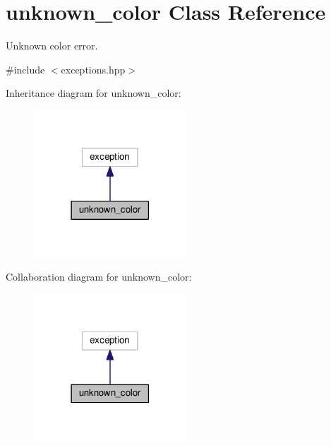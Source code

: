 \hypertarget{classunknown__color}{}\section{unknown\+\_\+color Class Reference}
\label{classunknown__color}


Unknown color error.  




{\ttfamily \#include $<$exceptions.\+hpp$>$}



Inheritance diagram for unknown\+\_\+color\+:\nopagebreak
\begin{figure}[H]
\begin{center}
\leavevmode
\includegraphics[width=162pt]{classunknown__color__inherit__graph}
\end{center}
\end{figure}


Collaboration diagram for unknown\+\_\+color\+:\nopagebreak
\begin{figure}[H]
\begin{center}
\leavevmode
\includegraphics[width=162pt]{classunknown__color__coll__graph}
\end{center}
\end{figure}

